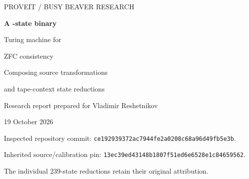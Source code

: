 \documentclass[11pt,letterpaper]{article}
\theoremstyle{definition}\newtheorem{definition}[theorem]{Definition}
\newcommand{\Con}{\operatorname{Con}}
\newcommand{\ZFC}{\mathrm{ZFC}}
\begin{document}
\begin{titlepage}
\vspace*{0.45in}
{\small\sffamily PROVEIT \quad / \quad BUSY BEAVER RESEARCH}\par
\vspace{0.40in}
{\Huge\bfseries A \FinalStates-state binary\par Turing machine for\par ZFC consistency}\par
\vspace{0.25in}
{\Large Composing source transformations\par and tape-context state reductions}\par
\vspace{0.35in}
{\large Research report prepared for Vladimir Reshetnikov}\par
19 October 2026
\vspace{0.40in}
\begin{abstract}
We give an explicit binary, one-tape Turing machine with
\textbf{\FinalStates\ working states, including its blank-tape initializer},
and an ordinary mathematical proof formalizable in ZFC that its nonhalting
is equivalent to $\Con(\ZFC)$.  The tape is two-way infinite, every move is
left or right, and the separate halting outcome is not counted as a working
state.  Thus the construction meets the requested threshold of fewer than
239 states without a free input, prewritten tape, or extra alphabet symbol.

The starting point is the maintained 240-state source-rotation machine.
Two incoming reports contain distinct 239-state improvements: a source
reassociation with decoder sharing, and a coordinated runtime-helper fold.
We prove that these improvements compose to 238 states.  The substantive
compatibility check is a universal tape guard on the changed source;
disjoint edits alone would not justify composition.
\ifFurtherReduction
A further newly discovered coordinated decoder fold then removes one more
state, giving the primary 237-state machine.  Its simulation uses an
inductive local tape invariant and finite positive blocks.
\fi

The literal final machine is independently checked on all 8,386 guarded
source-instruction interfaces, with arbitrary natural register values,
arbitrary nonnegative padding, and an arbitrary finite spare tail.  We
include complete transition tables, deterministic constructors, finite
source and local certificates, full runtime records, and independent
source, tape, and startup checkers.  The exact final startup takes
$\FinalBoot$ steps.  Existing source/calculus/ZFC calibration is explicitly
inherited.  This report does not supply a newly kernel-checked Lean or
Rocq endpoint or a serialized object-theory derivation for the final table.
\end{abstract}
\vfill
{\small Inspected repository commit: \texttt{ce192939372ac7944fe2a0208c68a96d49fb5e3b}.\par
Inherited source/calibration pin: \texttt{13ec39ed43148b1807f51ed6e6528e1c84659562}.\par
The individual 239-state reductions retain their original attribution.}
\end{titlepage}
\end{document}
